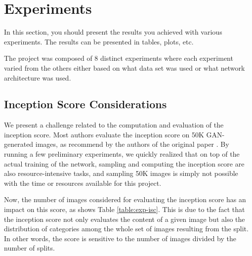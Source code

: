 
\section{Experiments}
In this section, you should
present the results you achieved with various experiments. The results
can be presented in tables, plots, etc. 

The project was composed of 8 distinct experiments where each experiment varied from the others either based on what data set was used or what network architecture was used.

\subsection{Inception Score Considerations}

We present a challenge related to the computation and evaluation of the inception score. Most authors evaluate the inception score on 50K GAN-generated images, as recommend by the authors of the original paper \cite{salimans2016improved}. By running a few preliminary experiments, we quickly realized that on top of the actual training of the network, sampling and computing the inception score are also resource-intensive tasks, and sampling 50K images is simply not possible with the time or resources available for this project.


Now, the number of images considered for evaluating the inception score has an impact on this score, as shows Table \ref{table:exp-isc}. This is due to the fact that the inception score not only evaluates the content of a given image but also the distribution of categories among the whole set of images resulting from the split. In other words, the score is sensitive to the number of images divided by the number of splits. 

